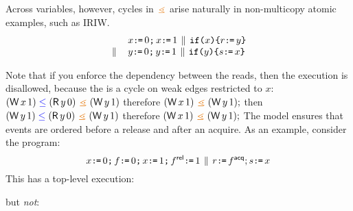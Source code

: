 Across variables, however, cycles in $\gtN$ arise naturally in non-multicopy
atomic examples, such as IRIW.
\[\begin{array}{rl}
  &x\texttt{:}\mkern-1mu\texttt{=}\,0\texttt{;}\, x\texttt{:}\mkern-1mu\texttt{=}\, 1
  \,\mathbin{\|}\,
  \texttt{if}\allowbreak\texttt{(}x\texttt{)}\allowbreak\texttt{\{} r\texttt{:}\mkern-1mu\texttt{=}\, y \texttt{\}}
 \\{}
  \,\mathbin{\|}\,&
  y\texttt{:}\mkern-1mu\texttt{=}\,0\texttt{;}\, y\texttt{:}\mkern-1mu\texttt{=}\, 1
  \,\mathbin{\|}\,
  \texttt{if}\allowbreak\texttt{(}y\texttt{)}\allowbreak\texttt{\{} s\texttt{:}\mkern-1mu\texttt{=}\, x \texttt{\}}
\end{array}\]
\begin{tikzdisplay}[node distance=1em]
\end{tikzdisplay}
Note that if you enforce the dependency between the reads, then the execution
is disallowed, because the is a cycle on weak edges restricted to $x$:
\begin{math}
  (\DW{x}{1})\le (\DR{y}{0}) \gtN (\DW{y}{1})
\end{math}
therefore
\begin{math}
  (\DW{x}{1}) \gtN  (\DW{y}{1});
\end{math}
then
\begin{math}
  (\DW{y}{1})\le (\DR{y}{0}) \gtN (\DW{y}{1})
\end{math}
therefore
\begin{math}
  (\DW{x}{1}) \gtN  (\DW{y}{1});
\end{math}
The model ensures that events are ordered before a release and
after an acquire.
As an example, consider the program:
\[
  x\texttt{:}\mkern-1mu\texttt{=}\,0\texttt{;}\, f\texttt{:}\mkern-1mu\texttt{=}\,0\texttt{;}\, x\texttt{:}\mkern-1mu\texttt{=}\, 1\texttt{;}\, f ^{\mathsf{rel}}\texttt{:}\mkern-1mu\texttt{=}\,1 \,\mathbin{\|}\, r\texttt{:}\mkern-1mu\texttt{=}\, f^{\mathsf{acq}}; s\texttt{:}\mkern-1mu\texttt{=}\, x
\]
This has a top-level execution:
\begin{tikzdisplay}[node distance=1em]
\end{tikzdisplay}
but \emph{not}:
\begin{tikzdisplay}[node distance=1em]
\end{tikzdisplay}

